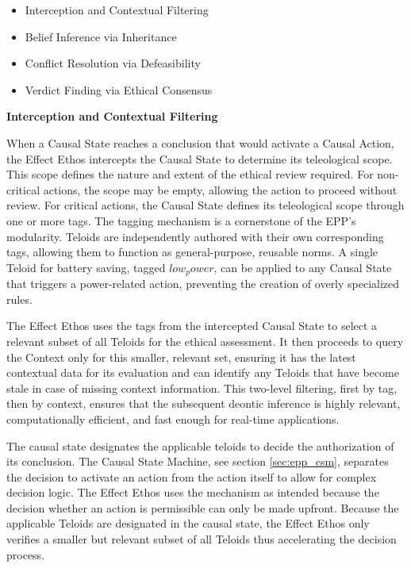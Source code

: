 \begin{itemize}
	\item  Interception and Contextual Filtering
	\item  Belief Inference via Inheritance
	\item  Conflict Resolution via Defeasibility
	\item  Verdict Finding via Ethical Consensus
\end{itemize}

\textbf{Interception and Contextual Filtering}

When a Causal State reaches a conclusion that would activate a Causal Action, the Effect Ethos intercepts the Causal State to determine its teleological scope. This scope defines the nature and extent of the ethical review required. For non-critical actions, the scope may be empty, allowing the action to proceed without review. For critical actions, the Causal State defines its teleological scope through one or more tags. The tagging mechanism is a cornerstone of the EPP's modularity. Teloids are independently authored with their own corresponding tags, allowing them to function as general-purpose, reusable norms. A single Teloid for battery saving, tagged $low_power$, can be applied to any Causal State that triggers a power-related action, preventing the creation of overly specialized rules.


The Effect Ethos uses the tags from the intercepted Causal State to select a relevant subset of all Teloids for the ethical assessment. It then proceeds to query the Context only for this smaller, relevant set, ensuring it has the latest contextual data for its evaluation and can identify any Teloids that have become stale in case of missing context information. This two-level filtering, first by tag, then by context, ensures that the subsequent deontic inference is highly relevant, computationally efficient, and fast enough for real-time applications.

The causal state designates the applicable teloids to decide the authorization of its conclusion. The Causal State Machine, see section \ref{sec:epp_csm}, separates the decision to activate an action from the action itself to allow for complex decision logic. The Effect Ethos uses the mechanism as intended because the decision whether an action is permissible can only be made upfront. Because the applicable Teloids are designated in the causal state, the Effect Ethos only verifies a smaller but relevant subset of all Teloids thus accelerating the decision process.


